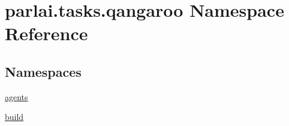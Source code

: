 \hypertarget{namespaceparlai_1_1tasks_1_1qangaroo}{}\section{parlai.\+tasks.\+qangaroo Namespace Reference}
\label{namespaceparlai_1_1tasks_1_1qangaroo}
\subsection*{Namespaces}
\begin{DoxyCompactItemize}
\item 
 \hyperlink{namespaceparlai_1_1tasks_1_1qangaroo_1_1agents}{agents}
\item 
 \hyperlink{namespaceparlai_1_1tasks_1_1qangaroo_1_1build}{build}
\end{DoxyCompactItemize}
